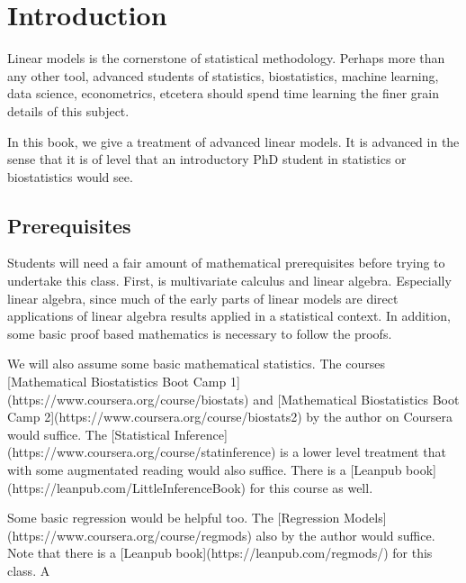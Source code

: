 \chapter{Introduction}


Linear models is the cornerstone of statistical methodology.
Perhaps more than any other tool, advanced students of
statistics, biostatistics, machine learning, data science,
econometrics, etcetera should spend time learning the
finer grain details of this subject.

In this book, we give a treatment of advanced linear models.
It is advanced in the sense that it is of level that an
introductory PhD student in statistics or biostatistics
would see.

\section{Prerequisites}

Students will need a fair amount of mathematical prerequisites
before trying to undertake this class. First, is multivariate
calculus and linear algebra. Especially linear algebra, since
much of the early parts of linear models are direct applications
of linear algebra results applied in a statistical context.
In addition, some basic proof based mathematics is necessary
to follow the proofs.

We will also assume some basic mathematical statistics. The
courses [Mathematical Biostatistics Boot Camp 1](https://www.coursera.org/course/biostats)
and [Mathematical Biostatistics Boot Camp 2](https://www.coursera.org/course/biostats2)
by the author on Coursera would suffice. The [Statistical Inference](https://www.coursera.org/course/statinference) is a lower level
treatment that with some augmentated reading would also suffice.
There is a [Leanpub book](https://leanpub.com/LittleInferenceBook) for
this course as well.

Some basic regression would
be helpful too. The [Regression Models](https://www.coursera.org/course/regmods)
also by the author would suffice. Note that there is a
[Leanpub book](https://leanpub.com/regmods/) for this class. A
